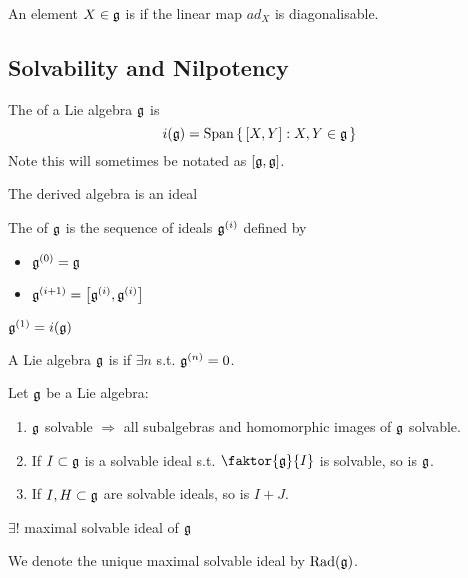 \documentclass{article}
\begin{document}
\begin{definition}[ad-diagonalisable]
	An element $X\in\mf{g}$ is  if the linear map $ad_X$ is diagonalisable. 
\end{definition}


\subsection{Solvability and Nilpotency}

\begin{definition}
	The  of a Lie algebra $\mf{g}$ is 
	\[
	i(\mf{g})=\spn\set{\comm[X]{Y} : X,Y\in\mf{g}}
	\]
	Note this will sometimes be notated as $\comm[\mf{g}]{\mf{g}}$. 
\end{definition}

\begin{prop}
	The derived algebra is an ideal
\end{prop}

\begin{definition}
	The  of $\mf{g}$ is the sequence of ideals $\mf{g}^{(i)}$ defined by 
	\begin{itemize}
		\item $\mf{g}^{(0)} = \mf{g}$
		\item $\mf{g}^{(i+1)} = \comm[\mf{g}^{(i)}]{\mf{g}^{(i)}}$
	\end{itemize} 
\end{definition}

\begin{remark}
	$\mf{g}^{(1)} = i(\mf{g})$
\end{remark}

\begin{definition}
	A Lie algebra $\mf{g}$ is  if $\exists n$ s.t. $\mf{g}^{(n)}=0$. 
\end{definition}

\begin{prop}
	Let $\mf{g}$ be a Lie algebra:
	\begin{enumerate}
		\item $\mf{g}$ solvable $\Rightarrow$ all subalgebras and homomorphic images of $\mf{g}$ solvable.
		\item If $I \subset \mf{g}$ is a solvable ideal s.t. $\faktor{\mf{g}}{I}$ is solvable, so is $\mf{g}$. 
		\item If $I,H \subset \mf{g}$ are solvable ideals, so is $I+J$. 
	\end{enumerate}
\end{prop}
\begin{corollary}
	$\exists ! $ maximal solvable ideal of $\mf{g}$
\end{corollary}
\begin{definition}
	We denote the unique maximal solvable ideal by $\Rad(\mf{g})$. 
\end{definition}
\end{document}
